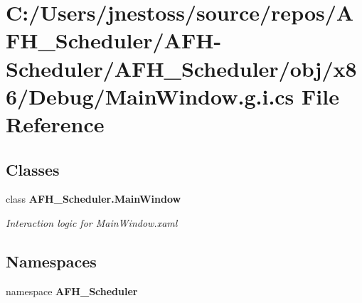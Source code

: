 \section{C\+:/\+Users/jnestoss/source/repos/\+A\+F\+H\+\_\+\+Scheduler/\+A\+F\+H-\/\+Scheduler/\+A\+F\+H\+\_\+\+Scheduler/obj/x86/\+Debug/\+Main\+Window.g.\+i.\+cs File Reference}
\label{x86_2_debug_2_main_window_8g_8i_8cs}
\subsection*{Classes}
\begin{DoxyCompactItemize}
\item 
class \textbf{ A\+F\+H\+\_\+\+Scheduler.\+Main\+Window}
\begin{DoxyCompactList}\small\item\em Interaction logic for Main\+Window.\+xaml \end{DoxyCompactList}\end{DoxyCompactItemize}
\subsection*{Namespaces}
\begin{DoxyCompactItemize}
\item 
namespace \textbf{ A\+F\+H\+\_\+\+Scheduler}
\end{DoxyCompactItemize}
